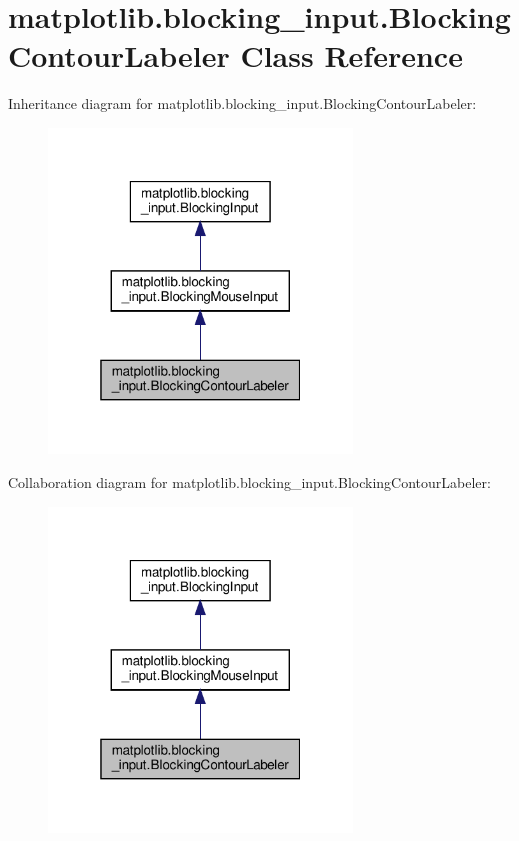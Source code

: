 \hypertarget{classmatplotlib_1_1blocking__input_1_1BlockingContourLabeler}{}\section{matplotlib.\+blocking\+\_\+input.\+Blocking\+Contour\+Labeler Class Reference}
\label{classmatplotlib_1_1blocking__input_1_1BlockingContourLabeler}


Inheritance diagram for matplotlib.\+blocking\+\_\+input.\+Blocking\+Contour\+Labeler\+:
\nopagebreak
\begin{figure}[H]
\begin{center}
\leavevmode
\includegraphics[width=229pt]{classmatplotlib_1_1blocking__input_1_1BlockingContourLabeler__inherit__graph}
\end{center}
\end{figure}


Collaboration diagram for matplotlib.\+blocking\+\_\+input.\+Blocking\+Contour\+Labeler\+:
\nopagebreak
\begin{figure}[H]
\begin{center}
\leavevmode
\includegraphics[width=229pt]{classmatplotlib_1_1blocking__input_1_1BlockingContourLabeler__coll__graph}
\end{center}
\end{figure}
